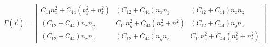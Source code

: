 \documentclass[preview]{standalone}
\begin{document}
\begin{align*}
\Gamma(\vec{n}) =
            \begin{bmatrix}
            C_{11}n_x^2 + C_{44}(n_y^2 + n_z^2) & (C_{12}+C_{44})n_x n_y & (C_{12}+C_{44})n_x n_z \\[0.3cm]
            (C_{12}+C_{44})n_x n_y & C_{11}n_y^2 + C_{44}(n_x^2 + n_z^2) & (C_{12}+C_{44})n_y n_z \\[0.3cm]
            (C_{12}+C_{44})n_x n_z & (C_{12}+C_{44})n_y n_z & C_{11}n_z^2 + C_{44}(n_x^2 + n_y^2)
            \end{bmatrix}
\end{align*}
\end{document}
